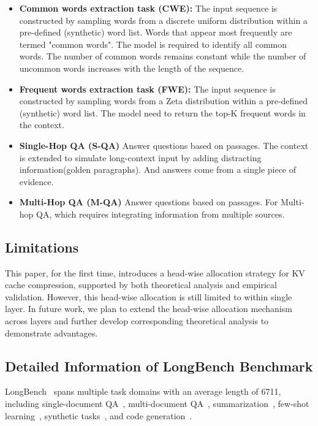 \begin{itemize}
	\item \textbf{Common words extraction task (CWE): } The input sequence is constructed by sampling words from a discrete uniform distribution within a pre-defined (synthetic) word list. Words that appear most frequently are termed "common words". The model is required to identify all common words. The number of common words remains constant while the number of uncommon words increases with the length of the sequence.
	
	
	
	\item \textbf{Frequent words extraction task (FWE): } The input sequence is constructed by sampling words from a Zeta distribution within a pre-defined (synthetic) word list. The model need to return the top-K frequent words in the context.
	
	\item \textbf{Single-Hop QA (S-QA)} Answer questions based on passages. The context is extended to simulate long-context input by adding distracting information(golden paragraphs). And answers come from a single piece of evidence.
	
	\item \textbf{Multi-Hop QA (M-QA)} Answer questions based on passages. For Multi-hop QA, which requires integrating information from multiple sources.
	
\end{itemize}

\subsection{Limitations}
\label{apdx:lim}
This paper, for the first time, introduces a head-wise allocation strategy for KV cache compression, supported by both theoretical analysis and empirical validation. However, this head-wise allocation is still limited to within single layer. In future work, we plan to extend the head-wise allocation mechanism across layers and further develop corresponding theoretical analysis to demonstrate advantages.


\subsection{Detailed Information of LongBench Benchmark}
\label{apdx:longbench_info}
LongBench~\cite{bai2023longbench} spans multiple task domains with an average length of 6711, including single-document QA~\cite{kovcisky2018narrativeqa,dasigi2021dataset}, multi-document QA~\cite{yang2018hotpotqa,ho-etal-2020-constructing,trivedi2022musique}, summarization~\cite{huang2021efficient,zhong2021qmsum,fabbri2019multi}, few-shot learning~\cite{joshi2017triviaqalargescaledistantly,gliwa2019samsum,li2002learning}, synthetic tasks~\cite{bai2023longbench}, and code generation~\cite{guo2023longcoderlongrangepretrainedlanguage,liu2023repobenchbenchmarkingrepositorylevelcode}. 



